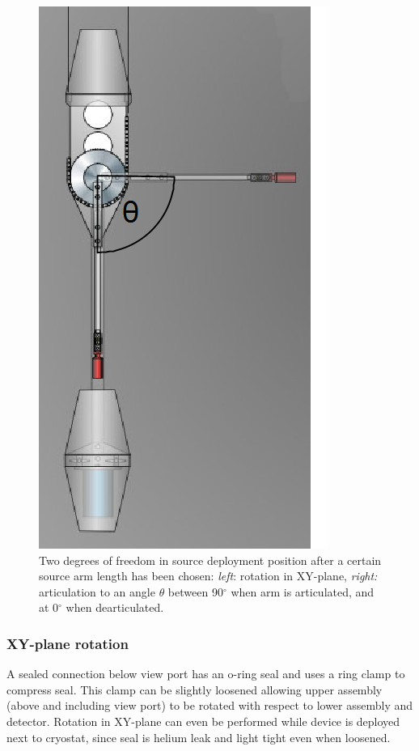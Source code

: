 \begin{figure}[htbp]
  \includegraphics[height=0.37\textheight]{Figures/DeploymentDevice_articulation}
  \caption{Two degrees of freedom in source deployment position after a certain source arm length has been chosen: \textit{left}: rotation in XY-plane, \textit{right:} articulation to an angle $\theta$ between 90$^{\circ}$ when arm is articulated, and at 0$^{\circ}$ when dearticulated. }
  \label{fig:coordinate_system}
\end{figure} 

\subsubsection{XY-plane rotation}\label{sec:XYrotation}
A sealed connection below view port has an o-ring seal and uses a ring clamp to compress seal. This clamp can be slightly loosened allowing upper assembly (above and including view port) to be rotated with respect to lower assembly and detector. Rotation in XY-plane can even be performed while device is deployed next to cryostat, since seal is helium leak and light tight even when loosened.


